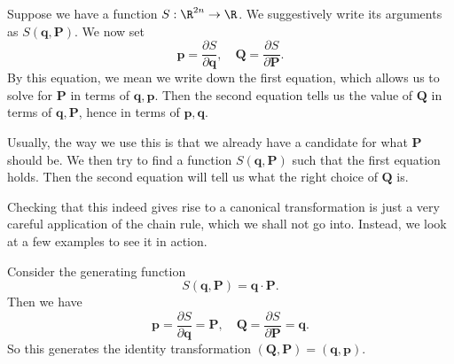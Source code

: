 \documentclass[a4paper]{article}
\begin{document}
Suppose we have a function $S: \R^{2n} \to \R$. We suggestively write its arguments as $S(\mathbf{q}, \mathbf{P})$. We now set
\[
  \mathbf{p} = \frac{\partial S}{\partial \mathbf{q}},\quad \mathbf{Q} = \frac{\partial S}{\partial \mathbf{P}}.
\]
By this equation, we mean we write down the first equation, which allows us to solve for $\mathbf{P}$ in terms of $\mathbf{q}, \mathbf{p}$. Then the second equation tells us the value of $\mathbf{Q}$ in terms of $\mathbf{q}, \mathbf{P}$, hence in terms of $\mathbf{p}, \mathbf{q}$.

Usually, the way we use this is that we already have a candidate for what $\mathbf{P}$ should be. We then try to find a function $S(\mathbf{q}, \mathbf{P})$ such that the first equation holds. Then the second equation will tell us what the right choice of $\mathbf{Q}$ is.

Checking that this indeed gives rise to a canonical transformation is just a very careful application of the chain rule, which we shall not go into. Instead, we look at a few examples to see it in action.
\begin{eg}
  Consider the generating function
  \[
    S(\mathbf{q}, \mathbf{P}) = \mathbf{q} \cdot \mathbf{P}.
  \]
  Then we have
  \[
    \mathbf{p} = \frac{\partial S}{\partial \mathbf{q}} = \mathbf{P},\quad \mathbf{Q} = \frac{\partial S}{\partial \mathbf{P}} = \mathbf{q}.
  \]
  So this generates the identity transformation $(\mathbf{Q}, \mathbf{P}) = (\mathbf{q}, \mathbf{p})$.
\end{eg}
\end{document}
